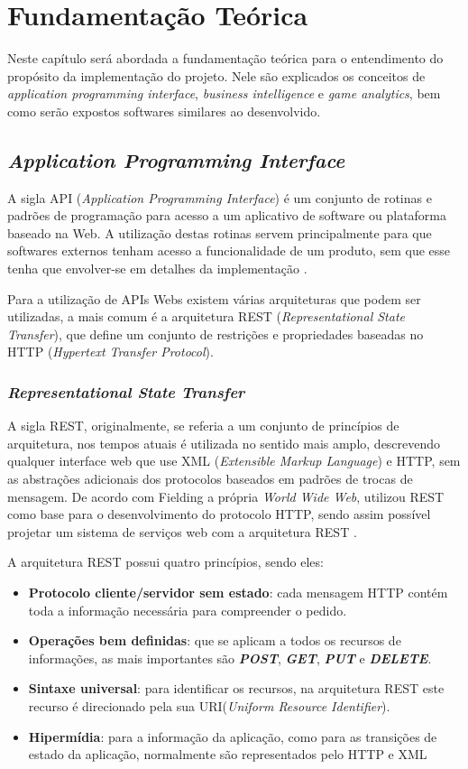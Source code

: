 \chapter[Fundamentação Teórica]{Fundamentação Teórica}
Neste capítulo será abordada a fundamentação teórica para o entendimento do propósito da implementação do projeto. Nele são explicados os conceitos de \textit{application programming interface}, \textit{business intelligence} e \textit{game analytics}, bem como serão expostos softwares similares ao desenvolvido.

\section{\textit{Application Programming Interface}}
A sigla API (\textit{Application Programming Interface}) é um conjunto de rotinas e padrões de programação para acesso a um aplicativo de software ou plataforma baseado na Web. A utilização destas rotinas servem principalmente para que softwares externos tenham acesso a funcionalidade de um produto, sem que esse tenha que envolver-se em detalhes da implementação \cite{api}.

Para a utilização de APIs Webs existem várias arquiteturas que podem ser utilizadas, a mais comum é a arquitetura REST (\textit{Representational State Transfer}), que define um conjunto de restrições e propriedades baseadas no HTTP (\textit{Hypertext Transfer Protocol}).
\subsection{\textit{Representational State Transfer}}
A sigla REST, originalmente, se referia a um conjunto de princípios de arquitetura, nos tempos atuais é utilizada no sentido mais amplo, descrevendo qualquer interface web que use XML (\textit{Extensible Markup Language}) e HTTP, sem as abstrações adicionais dos protocolos baseados em padrões de trocas de mensagem. De acordo com Fielding a própria \textit{World Wide Web}, utilizou REST como base para o desenvolvimento do protocolo HTTP, sendo assim possível projetar um sistema de serviços web com a arquitetura REST \cite{fielding}.

A arquitetura REST possui quatro princípios, sendo eles:
\begin{itemize}
	\item \textbf{Protocolo cliente/servidor sem estado}: cada mensagem HTTP contém toda a informação necessária para compreender o pedido.
	\item \textbf{Operações bem definidas}: que se aplicam a todos os recursos de informações, as mais importantes são \textit{\textbf{POST}}, \textit{\textbf{GET}}, \textit{\textbf{PUT}} e \textit{\textbf{DELETE}}.
	\item \textbf{Sintaxe universal}: para identificar os recursos, na arquitetura REST este recurso é direcionado pela sua URI(\textit{Uniform Resource Identifier}).
	\item \textbf{Hipermídia}: para a informação da aplicação, como para as transições de estado da aplicação, normalmente são representados pelo HTTP e XML
\end{itemize}

